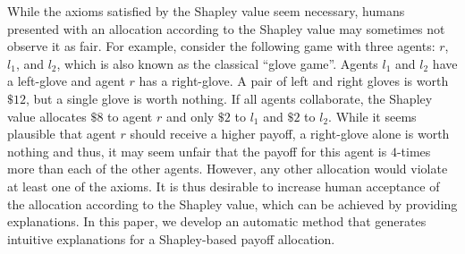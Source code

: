 \documentclass[letterpaper]{article} %
\begin{document}
While the axioms satisfied by the Shapley value seem necessary, humans presented with an allocation according to the Shapley value may sometimes not observe it as fair. For example, consider the following game with three agents: $r$, $l_1$, and $l_2$, which is also known as the classical ``glove game''. Agents $l_1$ and $l_2$ have a left-glove and agent $r$ has a right-glove. A pair of left and right gloves is worth $\$12$, but a single glove is worth nothing. If all agents collaborate, the Shapley value allocates $\$8$ to agent $r$ and only $\$2$ to $l_1$ and $\$2$ to $l_2$. While it seems plausible that agent $r$ should receive a higher payoff, a right-glove alone is worth nothing and thus, it may seem unfair that the payoff for this agent is $4$-times more than each of the other agents. However, any other allocation would violate at least one of the axioms. It is thus desirable to increase human acceptance of the allocation according to the Shapley value, which can be achieved by providing explanations. 
In this paper, we develop an automatic method that generates intuitive explanations for a Shapley-based payoff allocation.

\end{document}
